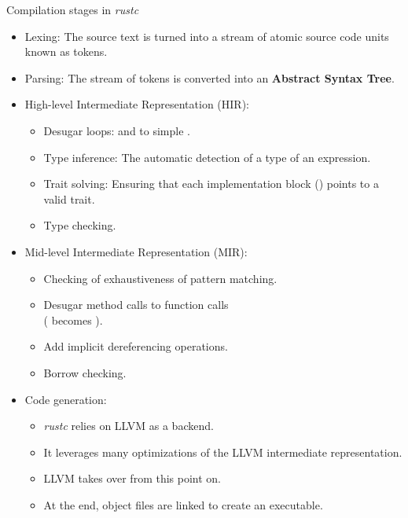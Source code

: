 \documentclass{beamer}
\begin{document}
\begin{frame}{Compilation stages in \emph{rustc}}
  \scriptsize

  \begin{itemize}
    \item Lexing: The source text is turned into a stream of atomic source code units known as tokens.
          \pause
    \item Parsing: The stream of tokens is converted into an \textbf{Abstract Syntax Tree}.
          \pause
    \item High-level Intermediate Representation (HIR):
          \begin{itemize}
            \scriptsize
            [circle]
            \item Desugar loops:  and  to simple .
            \item Type inference: The automatic detection of a type of an expression.
            \item Trait solving: Ensuring that each implementation block () points to a valid trait.
            \item Type checking.
          \end{itemize}
          \pause
    \item Mid-level Intermediate Representation (MIR):
          \begin{itemize}
            \scriptsize
            [circle]
            \item Checking of exhaustiveness of pattern matching.
            \item Desugar method calls to function calls\\
                  ( becomes ).
            \item Add implicit dereferencing operations.
            \item Borrow checking.
          \end{itemize}
          \pause
    \item Code generation:
          \begin{itemize}
            \scriptsize
            [circle]
            \item \emph{rustc} relies on LLVM as a backend.
            \item It leverages many optimizations of the LLVM intermediate representation.
            \item LLVM takes over from this point on.
            \item At the end, object files are linked to create an executable.
          \end{itemize}
  \end{itemize}
\end{frame}
\end{document}

